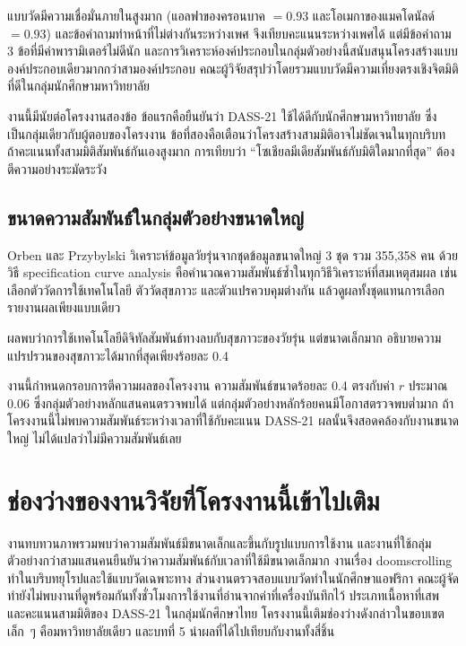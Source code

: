 แบบวัดมีความเชื่อมั่นภายในสูงมาก (แอลฟาของครอนบาค $= 0.93$ และโอเมกาของแมคโดนัลด์ $= 0.93$)
และข้อคำถามทำหน้าที่ไม่ต่างกันระหว่างเพศ จึงเทียบคะแนนระหว่างเพศได้
แต่มีข้อคำถาม 3 ข้อที่มีค่าพารามิเตอร์ไม่ดีนัก
และการวิเคราะห์องค์ประกอบในกลุ่มตัวอย่างนี้สนับสนุนโครงสร้างแบบองค์ประกอบเดียวมากกว่าสามองค์ประกอบ
คณะผู้วิจัยสรุปว่าโดยรวมแบบวัดมีความเที่ยงตรงเชิงจิตมิติที่ดีในกลุ่มนักศึกษามหาวิทยาลัย

งานนี้มีนัยต่อโครงงานสองข้อ ข้อแรกคือยืนยันว่า DASS-21 ใช้ได้ดีกับนักศึกษามหาวิทยาลัย
ซึ่งเป็นกลุ่มเดียวกับผู้ตอบของโครงงาน ข้อที่สองคือเตือนว่าโครงสร้างสามมิติอาจไม่ชัดเจนในทุกบริบท
ถ้าคะแนนทั้งสามมิติสัมพันธ์กันเองสูงมาก การเทียบว่า
``โซเชียลมีเดียสัมพันธ์กับมิติใดมากที่สุด'' ต้องตีความอย่างระมัดระวัง

\subsection{ขนาดความสัมพันธ์ในกลุ่มตัวอย่างขนาดใหญ่}

Orben และ Przybylski \cite{orben2019association} วิเคราะห์ข้อมูลวัยรุ่นจากชุดข้อมูลขนาดใหญ่ 3 ชุด
รวม 355,358 คน ด้วยวิธี specification curve analysis
คือคำนวณความสัมพันธ์ซ้ำในทุกวิธีวิเคราะห์ที่สมเหตุสมผล เช่น เลือกตัววัดการใช้เทคโนโลยี ตัววัดสุขภาวะ
และตัวแปรควบคุมต่างกัน แล้วดูผลทั้งชุดแทนการเลือกรายงานผลเพียงแบบเดียว

ผลพบว่าการใช้เทคโนโลยีดิจิทัลสัมพันธ์ทางลบกับสุขภาวะของวัยรุ่น แต่ขนาดเล็กมาก
อธิบายความแปรปรวนของสุขภาวะได้มากที่สุดเพียงร้อยละ 0.4

งานนี้กำหนดกรอบการตีความผลของโครงงาน ความสัมพันธ์ขนาดร้อยละ 0.4 ตรงกับค่า $r$ ประมาณ 0.06
ซึ่งกลุ่มตัวอย่างหลักแสนคนตรวจพบได้ แต่กลุ่มตัวอย่างหลักร้อยคนมีโอกาสตรวจพบต่ำมาก
ถ้าโครงงานนี้ไม่พบความสัมพันธ์ระหว่างเวลาที่ใช้กับคะแนน DASS-21
ผลนั้นจึงสอดคล้องกับงานขนาดใหญ่ ไม่ได้แปลว่าไม่มีความสัมพันธ์เลย

\section{ช่องว่างของงานวิจัยที่โครงงานนี้เข้าไปเติม}

งานทบทวนภาพรวมพบว่าความสัมพันธ์มีขนาดเล็กและขึ้นกับรูปแบบการใช้งาน
และงานที่ใช้กลุ่มตัวอย่างกว่าสามแสนคนยืนยันว่าความสัมพันธ์กับเวลาที่ใช้มีขนาดเล็กมาก
งานเรื่อง doomscrolling ทำในบริบทยุโรปและใช้แบบวัดเฉพาะทาง
ส่วนงานตรวจสอบแบบวัดทำในนักศึกษาแอฟริกา
คณะผู้จัดทำยังไม่พบงานที่ดูพร้อมกันทั้งชั่วโมงการใช้งานที่อ่านจากค่าที่เครื่องบันทึกไว้ ประเภทเนื้อหาที่เสพ
และคะแนนสามมิติของ DASS-21 ในกลุ่มนักศึกษาไทย
โครงงานนี้เติมช่องว่างดังกล่าวในขอบเขตเล็ก~ๆ คือมหาวิทยาลัยเดียว
และบทที่ 5 นำผลที่ได้ไปเทียบกับงานทั้งสี่ชิ้น
